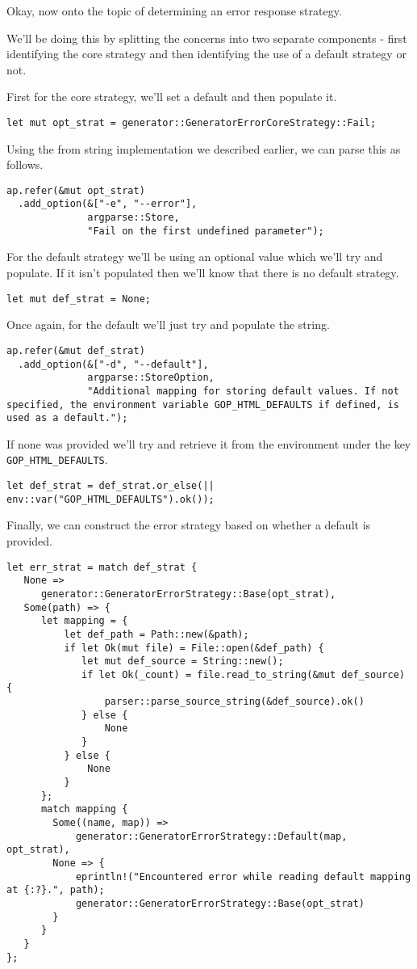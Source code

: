 \documentclass[11pt]{article}
\begin{document}
Okay, now onto the topic of determining an error response strategy.

We'll be doing this by splitting the concerns into two separate components - first identifying the core strategy and then identifying 
the use of a default strategy or not.

First for the core strategy, we'll set a default and then populate it.
\begin{verbatim}
let mut opt_strat = generator::GeneratorErrorCoreStrategy::Fail;
\end{verbatim}

Using the from string implementation we described earlier, we can parse this as follows.
\begin{verbatim}
ap.refer(&mut opt_strat)
  .add_option(&["-e", "--error"],
              argparse::Store,
              "Fail on the first undefined parameter");
\end{verbatim}

For the default strategy we'll be using an optional value which we'll try and populate. If it isn't populated then we'll know that
there is no default strategy.
\begin{verbatim}
let mut def_strat = None;
\end{verbatim}

Once again, for the default we'll just try and populate the string.
\begin{verbatim}
ap.refer(&mut def_strat)
  .add_option(&["-d", "--default"],
              argparse::StoreOption,
              "Additional mapping for storing default values. If not specified, the environment variable GOP_HTML_DEFAULTS if defined, is used as a default.");
\end{verbatim}

If none was provided we'll try and retrieve it from the environment under the key \texttt{GOP\_HTML\_DEFAULTS}.
\begin{verbatim}
let def_strat = def_strat.or_else(|| env::var("GOP_HTML_DEFAULTS").ok());
\end{verbatim}

Finally, we can construct the error strategy based on whether a default is provided.
\begin{verbatim}
let err_strat = match def_strat {
   None => 
      generator::GeneratorErrorStrategy::Base(opt_strat),
   Some(path) => {
      let mapping = { 
          let def_path = Path::new(&path);
          if let Ok(mut file) = File::open(&def_path) {
             let mut def_source = String::new();
             if let Ok(_count) = file.read_to_string(&mut def_source) {
                 parser::parse_source_string(&def_source).ok()
             } else {
                 None
             }
          } else {
              None
          } 
      };
      match mapping {
        Some((name, map)) => 
            generator::GeneratorErrorStrategy::Default(map, opt_strat), 
        None => {
            eprintln!("Encountered error while reading default mapping at {:?}.", path);
            generator::GeneratorErrorStrategy::Base(opt_strat)
        }
      }
   }
};
\end{verbatim}
\end{document}
